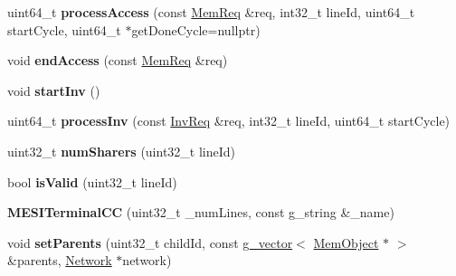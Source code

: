 \begin{DoxyCompactItemize}
\item 
\hypertarget{classMESITerminalCC_a3c47894ac0d31aed1fef4a66f4a2ac04}{uint64\-\_\-t {\bfseries process\-Access} (const \hyperlink{structMemReq}{Mem\-Req} \&req, int32\-\_\-t line\-Id, uint64\-\_\-t start\-Cycle, uint64\-\_\-t $\ast$get\-Done\-Cycle=nullptr)}\label{classMESITerminalCC_a3c47894ac0d31aed1fef4a66f4a2ac04}

\item 
\hypertarget{classMESITerminalCC_a648c7b00a16e95ac97f7efae7d97c431}{void {\bfseries end\-Access} (const \hyperlink{structMemReq}{Mem\-Req} \&req)}\label{classMESITerminalCC_a648c7b00a16e95ac97f7efae7d97c431}

\item 
\hypertarget{classMESITerminalCC_a2cc6d5b9501e12509bd9318932cf7ab8}{void {\bfseries start\-Inv} ()}\label{classMESITerminalCC_a2cc6d5b9501e12509bd9318932cf7ab8}

\item 
\hypertarget{classMESITerminalCC_a08ccd1bd159752c51a17f77a8a21d493}{uint64\-\_\-t {\bfseries process\-Inv} (const \hyperlink{structInvReq}{Inv\-Req} \&req, int32\-\_\-t line\-Id, uint64\-\_\-t start\-Cycle)}\label{classMESITerminalCC_a08ccd1bd159752c51a17f77a8a21d493}

\item 
\hypertarget{classMESITerminalCC_a4ef3939c2efc0847d3b4329d48b6f2d4}{uint32\-\_\-t {\bfseries num\-Sharers} (uint32\-\_\-t line\-Id)}\label{classMESITerminalCC_a4ef3939c2efc0847d3b4329d48b6f2d4}

\item 
\hypertarget{classMESITerminalCC_af790a8b2ff504692b53f907bc24b9cc1}{bool {\bfseries is\-Valid} (uint32\-\_\-t line\-Id)}\label{classMESITerminalCC_af790a8b2ff504692b53f907bc24b9cc1}

\item 
\hypertarget{classMESITerminalCC_a0d93783e167a6bca644354f77e60d1fe}{{\bfseries M\-E\-S\-I\-Terminal\-C\-C} (uint32\-\_\-t \-\_\-num\-Lines, const g\-\_\-string \&\-\_\-name)}\label{classMESITerminalCC_a0d93783e167a6bca644354f77e60d1fe}

\item 
\hypertarget{classMESITerminalCC_a230fc2239f2acf8f6e57786f8750483e}{void {\bfseries set\-Parents} (uint32\-\_\-t child\-Id, const \hyperlink{classg__vector}{g\-\_\-vector}$<$ \hyperlink{classMemObject}{Mem\-Object} $\ast$ $>$ \&parents, \hyperlink{classNetwork}{Network} $\ast$network)}\label{classMESITerminalCC_a230fc2239f2acf8f6e57786f8750483e}


\end{DoxyCompactItemize}
